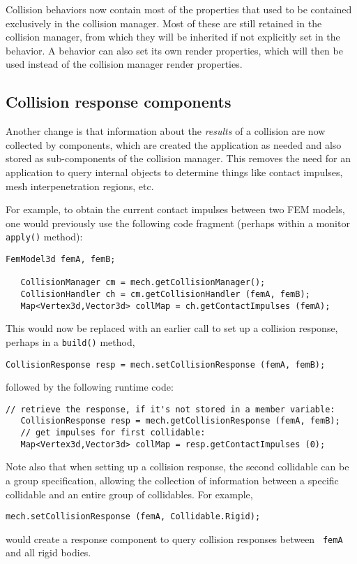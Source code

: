 \documentclass{article}
\begin{document}
Collision behaviors now contain most of the properties that used to be
contained exclusively in the collision manager. Most of these are
still retained in the collision manager, from which they will be
inherited if not explicitly set in the behavior. A behavior can also
set its own render properties, which will then be used instead of the
collision manager render properties.

\subsection*{Collision response components}

Another change is that information about the {\it results} of a
collision are now collected by
 components,
which are created the application as needed and also stored as
sub-components of the collision manager. This removes the need for an
application to query internal
 objects to
determine things like contact impulses, mesh interpenetration regions,
etc.

For example, to obtain the current contact impulses between two FEM
models, one would previously use the following code fragment (perhaps
within a monitor {\tt apply()} method):
%
\begin{lstlisting}[]
   FemModel3d femA, femB;
 
   CollisionManager cm = mech.getCollisionManager();
   CollisionHandler ch = cm.getCollisionHandler (femA, femB);
   Map<Vertex3d,Vector3d> collMap = ch.getContactImpulses (femA);
\end{lstlisting}
%
This would now be replaced with an earlier call to set up a collision
response, perhaps in a {\tt build()} method,
%
\begin{lstlisting}[]
   CollisionResponse resp = mech.setCollisionResponse (femA, femB);
\end{lstlisting}
%
followed by the following runtime code:
\begin{lstlisting}[]
   // retrieve the response, if it's not stored in a member variable:
   CollisionResponse resp = mech.getCollisionResponse (femA, femB);
   // get impulses for first collidable:
   Map<Vertex3d,Vector3d> collMap = resp.getContactImpulses (0);
\end{lstlisting}
%
Note also that when setting up a collision response, the second
collidable can be a group specification, allowing the collection of
information between a specific collidable and an entire
group of collidables.  For example,
%
\begin{lstlisting}[]
   mech.setCollisionResponse (femA, Collidable.Rigid);
\end{lstlisting}
%
would create a response component to query collision responses between {\tt
femA} and all rigid bodies.
\end{document}
